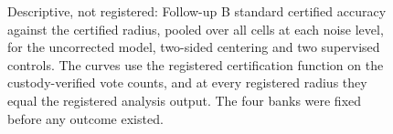 \begin{figure}[t]
\fi
\caption{Descriptive, not registered: Follow-up B standard certified accuracy
against the certified radius, pooled over all cells at each noise level, for
the uncorrected model, two-sided centering and two supervised controls. The
curves use the registered certification function on the custody-verified vote
counts, and at every registered radius they equal the registered analysis
output. The four banks were fixed before any outcome existed.}
\label{fig:followup-curves}
\end{figure}
